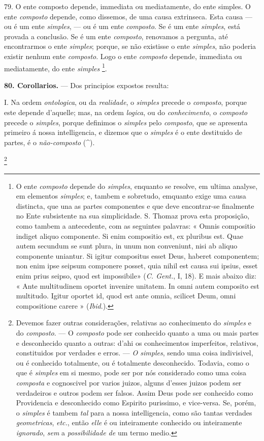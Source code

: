  79. O ente composto depende, immediata ou mediatamente, do ente simples. O ente \emph{composto} depende, como dissemos, de uma causa extrinseca. Esta causa --- ou é um ente \emph{simples}, --- ou é um ente \emph{composto}. Se é um ente \emph{simples}, está provada a conclusão. Se é um ente \emph{composto}, renovamos a pergunta, até encontrarmos o ente \emph{simples}; porque, se não existisse o ente \emph{simples}, não poderia existir nenhum ente \emph{composto}. Logo o ente \emph{composto} depende, immediata ou mediatamente, do ente \emph{simples} \footnote{O ente \emph{composto} depende do \emph{simples}, enquanto se resolve, em ultima analyse, em elementos \emph{simples}; e, tambem e sobretudo, emquanto exige uma causa distincta, que una as partes componentes e que deve encontrar-se finalmente no Ente subsistente na sua simplicidade. S. Thomaz prova esta proposição, como tambem a antecedente, com as seguintes palavras: « Omnis compositio indiget aliquo componente. Si enim compositio est, ex pluribus est. Quae autem secundum se sunt plura, in unum non conveniunt, nisi ab aliquo componente uniantur. Si igitur compositus esset Deus, haberet componentem; non enim ipse seipsum componere posset, quia nihil est causa sui ipsius, esset enim prius seipso, quod est impossibile» (\emph{C. Gent.}, I, 18). E mais abaixo diz: « Ante multitudinem oportet invenire unitatem. In omni autem composito est multitudo. Igitur oportet id, quod est ante omnia, scilicet Deum, omni compositione carere » (\emph{Ibid}.).}.

\textbf{80. Corollarios.} --- Dos principios expostos resulta:

I. Na ordem \emph{ontologica}, ou da \emph{realidade}, o \emph{simples} precede o \emph{composto}, porque este depende d'aquelle; mas, na ordem \emph{logica}, ou do \emph{conhecimento}, o \emph{composto} precede o \emph{simples}, porque definimos o \emph{simples} pelo \emph{composto}, que se apresenta primeiro á nossa intelligencia, e dizemos que o \emph{simples} é o ente destituido de partes, é o \emph{não-composto} (\textasciicircum{}).

\footnote{Devemos fazer outras considerações, relativas ao conhecimento do \emph{simples} e do \emph{composto}. --- O \emph{composto} pode ser conhecido quanto a uma ou mais partes e desconhecido quanto a outras: d'ahi os conhecimentos imperfeitos, relativos, constituidos por verdades e erros. --- \emph{O simples}, sendo uma coisa indivisivel, ou é conhecido totalmente, ou é totalmente desconhecido. Todavia, como o que é \emph{simples} em si mesmo, pode ser por nós considerado como uma coisa \emph{composta} e cognoscivel por varios juizos, alguns d'esses juizos podem ser verdadeiros e outros podem ser falsos. Assim Deus pode ser conhecido como Providencia e desconhecido como Espirito purissimo, e vice-versa. Se, porém, o \emph{simples} é tambem \emph{tal} para a nossa intelligencia, como são tantas verdades \emph{geometricas}, \emph{etc.}, então \emph{elle} é ou inteiramente conhecido ou inteiramente \emph{ignorado}, \emph{sem} a \emph{possibilidade de} um termo medio.\par}
